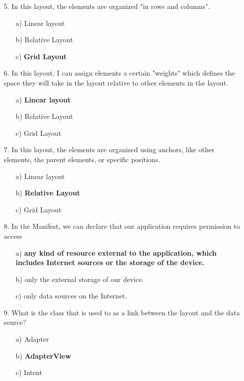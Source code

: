 \documentclass[12pt]{book}
\begin{document}
\begin{itemize}
    \item[5.] In this layout, the elements are organized "in rows and columns".
    \begin{itemize}
        \item[a)] Linear layout
        \item[b)] Relative Layout
        \item[c)] \textbf{Grid Layout}
    \end{itemize}
    
    \item[6.] In this layout, I can assign elements a certain "weights" which defines the space they will take in the layout relative to other elements in the layout.
    \begin{itemize}
        \item[a)] \textbf{Linear layout}
        \item[b)] Relative Layout
        \item[c)] Grid Layout
    \end{itemize}
    
    \item[7.] In this layout, the elements are organized using anchors, like other elements, the parent elements, or specific positions.
    \begin{itemize}
        \item[a)] Linear layout
        \item[b)] \textbf{Relative Layout}
        \item[c)] Grid Layout
    \end{itemize}
    
    \item[8.] In the Manifest, we can declare that our application requires permission to access
    \begin{itemize}
        \item[a)] \textbf{any kind of resource external to the application, which includes Internet sources or the storage of the device.}
        \item[b)] only the external storage of our device.
        \item[c)] only data sources on the Internet.
    \end{itemize}
    
    \item[9.] What is the class that is used to as a link between the layout and the data source?
    \begin{itemize}
        \item[a)] Adapter
        \item[b)] \textbf{AdapterView}
        \item[c)] Intent
    \end{itemize}


\end{itemize}
\end{document}
